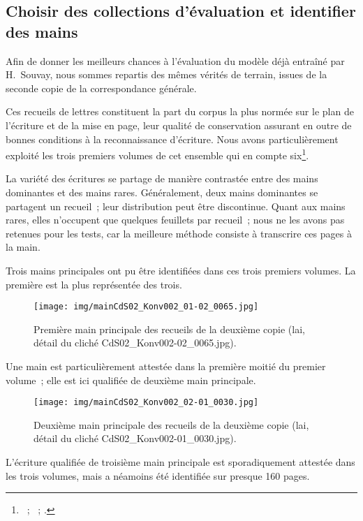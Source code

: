 \documentclass[a4paper,12pt,twoside]{book}
\begin{document}
			\subsection{Choisir des collections d'évaluation et identifier des mains}
				Afin de donner les meilleurs chances à l'évaluation du modèle déjà entraîné par H.~Souvay, nous sommes repartis des mêmes vérités de terrain, issues de la seconde copie de la correspondance générale.
				
				Ces recueils de lettres constituent la part du corpus la plus normée sur le plan de l'écriture et de la mise en page, leur qualité de conservation assurant en outre de bonnes conditions à la reconnaissance d'écriture. Nous avons particulièrement exploité les trois premiers volumes de cet ensemble qui en compte six\footnote{\cite{CdS02001330}~; \cite{CdS02001369}~; \cite{CdS02001334}.}.
				
				La variété des écritures se partage de manière contrastée entre des mains dominantes et des mains rares. Généralement, deux mains dominantes se partagent un recueil~; leur distribution peut être discontinue. Quant aux mains rares, elles n'occupent que quelques feuillets par recueil~; nous ne les avons pas retenues pour les tests, car la meilleure méthode consiste à transcrire ces pages à la main.
				
				Trois mains principales ont pu être identifiées dans ces trois premiers volumes. La première est la plus représentée des trois.
				
				\begin{figure}[!h]
					\centering
					\texttt{[image: img/mainCdS02\_Konv002\_01-02\_0065.jpg]}
					\caption{Première main principale des recueils de la deuxième copie (\gls{lai}, détail du cliché CdS02\_Konv002-02\_0065.jpg).}
					\label{}
				\end{figure}
			
				Une main est particulièrement attestée dans la première moitié du premier volume~; elle est ici qualifiée de \og deuxième main principale\fg.
				
				\begin{figure}[!h]
					\centering
					\texttt{[image: img/mainCdS02\_Konv002\_02-01\_0030.jpg]}
					\caption{Deuxième main principale des recueils de la deuxième copie (\gls{lai}, détail du cliché CdS02\_Konv002-01\_0030.jpg).}
					\label{}
				\end{figure}
			
				L'écriture qualifiée de \og troisième main principale \fg est sporadiquement attestée dans les trois volumes, mais a néamoins été identifiée sur presque 160 pages.
			
\end{document}
